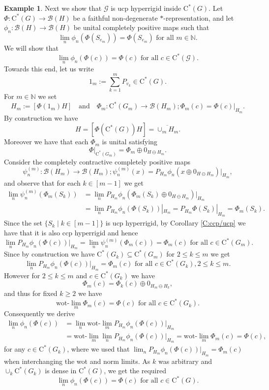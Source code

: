 \documentclass[11pt, draft]{amsart}
\numberwithin{equation}{section}
\theoremstyle{plain}
\theoremstyle{definition}
\newtheorem{example}[theorem]{Example}
\theoremstyle{remark}
\newcommand{\B}{{\mathcal{B}}}
\newcommand{\G}{{\mathcal{G}}}
\newcommand{\bN}{\mathbb{N}}
\newcommand{\foral}{\text{ for all }}
\newcommand{\qand}{\quad\text{and}\quad}
\newcommand{\ca}{\mathrm{C}^*}
\newcommand{\ol}{\overline}
\begin{document}
\begin{example}
Next we show that $\G$ is ucp hyperrigid inside $\ca(G)$.
Let $\Phi \colon \ca(G) \to \B(H)$ be a faithful non-degenerate $*$-representation, and let $\phi_n \colon \B(H) \to \B(H)$ be unital completely positive maps such that
\[
\lim_n \phi_n(\Phi(S_{e_m})) = \Phi(S_{e_m})
\foral m \in \bN.
\]
We will show that
\[
\lim_n \phi_n(\Phi(c)) = \Phi(c)
\foral c \in \ca(\G).
\]
Towards this end, let us write
\[
1_m := \sum_{k=1}^m P_{v_k} \in \ca(G).
\]
For $m \in \bN$ we set
\[
H_m := [\Phi(1_m)H]
\qand
\Phi_m \colon \ca(G_m) \to \B(H_m); \Phi_m(c) = \Phi(c)|_{H_m}.
\]
By construction we have
\[
H = [\Phi(\ca(G))H] = \ol{\cup_m H_m}.
\]
Moreover we have that each $\Phi_m$ is unital satisfying 
\[
\Phi|_{\ca(G_m)} = \Phi_m \oplus 0_{H \ominus H_m}.
\]
Consider the completely contractive completely positive maps
\[
\psi_n^{(m)} \colon \B(H_m) \to \B(H_m); \psi_n^{(m)}(x) = P_{H_m} \phi_n(x \oplus 0_{H \ominus H_m}) |_{H_m},
\]
and observe that for each $ k \in [m-1]$ we get
\begin{align*}
\lim_n \psi_n^{(m)}(\Phi_m(S_{k}))
& =
\lim_n P_{H_m} \phi_n(\Phi_m(S_{k}) \oplus 0_{H \ominus H_m}) |_{H_m} \\
& =
\lim_n P_{H_m} \phi_n(\Phi(S_{k})) |_{H_m} 
=
P_{H_m} \Phi(S_k) |_{H_m}
=
\Phi_m(S_k).
\end{align*}
Since the set $\{S_k \mid  k \in [m-1]\}$ is ucp hyperrigid, by Corollary \ref{C:ccp/ucp} we have that it is also ccp hyperrigid and hence
\[
\lim_n P_{H_m} \phi_n(\Phi(c)) |_{H_m}
=
\lim_n \psi_n^{(m)}(\Phi_m(c)) 
= 
\Phi_m(c)
\foral c \in \ca(G_m).
\]
Since by construction we have $\ca(G_k) \subseteq \ca(G_m)$ for $2\leq k \leq m$ we get
\[
\lim_n P_{H_m} \phi_n(\Phi(c)) |_{H_m}
=
\Phi_m(c) 
\foral c \in \ca(G_k),  2\leq k \leq m.
\]
However for $2\leq k \leq m$ and $c \in \ca(G_k)$ we have
\[
\Phi_m(c) = \Phi_k(c) \oplus 0_{H_m \ominus H_k},
\]
and thus for fixed $k\geq 2$ we have
\[
\text{wot-}\lim_m \Phi_m(c) = \Phi(c)
\foral c \in \ca(G_k).
\]
Consequently we derive 
\begin{align*}
\lim_n \phi_n(\Phi(c))
& =
\lim_n \text{wot-}\lim_m P_{H_m} \phi_n(\Phi(c)) |_{H_m} \\
& =
\text{wot-}\lim_m \lim_n P_{H_m} \phi_n(\Phi(c)) |_{H_m} 
= 
\text{wot-}\lim_m \Phi_m(c) = \Phi(c),
\end{align*}
for any $c \in \ca(G_k)$, where we used that $\lim_n P_{H_m} \phi_n(\Phi(c)) |_{H_m} = \Phi_m(c)$ when interchanging the wot and norm limits.
As $k$ was arbitrary and $\cup_k \ca(G_k)$ is dense in $\ca(G)$, we get the required
\[
\lim_n \phi_n(\Phi(c)) = \Phi(c)
\foral c \in \ca(G).
\]


\end{example}
\end{document}
